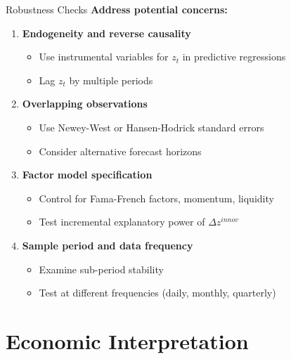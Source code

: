 \documentclass{beamer}
\begin{document}
\begin{frame}{Robustness Checks}
\textbf{Address potential concerns:}

\begin{enumerate}
\item \textbf{Endogeneity and reverse causality}
\begin{itemize}
\item Use instrumental variables for $z_t$ in predictive regressions
\item Lag $z_t$ by multiple periods
\end{itemize}
\vspace{0.2cm}

\item \textbf{Overlapping observations}
\begin{itemize}
\item Use Newey-West or Hansen-Hodrick standard errors
\item Consider alternative forecast horizons
\end{itemize}
\vspace{0.2cm}

\item \textbf{Factor model specification}
\begin{itemize}
\item Control for Fama-French factors, momentum, liquidity
\item Test incremental explanatory power of $\Delta z^{innov}$
\end{itemize}
\vspace{0.2cm}

\item \textbf{Sample period and data frequency}
\begin{itemize}
\item Examine sub-period stability
\item Test at different frequencies (daily, monthly, quarterly)
\end{itemize}
\end{enumerate}
\end{frame}

\section{Economic Interpretation}
\end{document}
